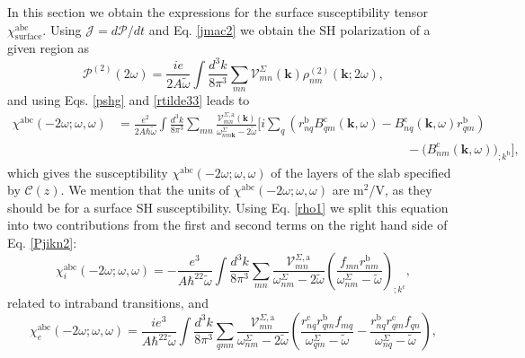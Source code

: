 In this section we obtain the expressions for the surface susceptibility tensor
$\chi^{\mathrm{abc}}_{\mathrm{surface}}$. Using
$\boldsymbol{\mathcal{J}}=d\boldsymbol{\mathcal{P}}/dt$ and Eq. \eqref{jmac2} we
obtain the SH polarization of a given region as
\begin{equation}\label{Pjikn}
\boldsymbol{\mathcal{P}}^{(2)}(2\omega)
= \frac{ie}{2A\tilde\omega} \int \frac{d^3 k}{8\pi^3}
\sum_{mn} \boldsymbol{\mathcal{V}}^{\Sigma}_{mn}(\mathbf{k})
\rho^{(2)}_{nm}(\mathbf{k};2\omega),
\end{equation}
and using Eqs. \eqref{pshg} and \eqref{rtilde33} leads to
\begin{align}\label{Pjikn2}
\chi^{\mathrm{a}\mathrm{b}\mathrm{c}}(-2\omega;\omega,\omega) 
&= \frac{e^2}{2A\hbar\tilde\omega}
\int \frac{d^3 k}{8\pi^3}
\sum_{mn}
\frac{\boldsymbol{\mathcal{V}}^{\Sigma,\mathrm{a}}_{mn}(\mathbf{k})}
{\omega^\Sigma_{nm\mathbf{k}}-2\tilde\omega}
\bigg[
i\sum_q\left(r_{nq}^{\mathrm{b}}B_{qm}^{\mathrm{c}}(\mathbf{k},\omega) -
  B_{nq}^{\mathrm{c}}(\mathbf{k},\omega) 
  r_{qm}^{\mathrm{b}}\right)\nonumber\\
&\qquad\qquad\qquad\qquad\qquad\qquad\qquad\qquad\qquad\qquad\qquad\quad
-\Big(B_{nm}^{\mathrm{c}}(\mathbf{k},\omega)\Big)_{;k^{\mathrm{b}}}
\bigg],
\end{align}
which gives the susceptibility
$\chi^{\mathrm{a}\mathrm{b}\mathrm{c}}(-2\omega;\omega,\omega)$ of the layers of
the slab specified by $\boldsymbol{\mathcal{C}}(z)$. We mention that the units
of $\chi^{\mathrm{a}\mathrm{b}\mathrm{c}}(-2\omega;\omega,\omega)$ are m$^2$/V,
as they should be for a surface SH susceptibility. Using Eq. \eqref{rho1} we
split this equation into two contributions from the first and second terms on
the right hand side of Eq. \eqref{Pjikn2}:
\begin{equation}
\chi^{\mathrm{a}\mathrm{b}\mathrm{c}}_i (-2\omega;\omega,\omega)
=-\frac{e^3}{A\hbar^22\tilde\omega}
\int \frac{d^3 k}{8\pi^3}
\sum_{mn}
\frac{\boldsymbol{\mathcal{V}}_{mn}^{\Sigma,\mathrm{a}}}
{\omega^\Sigma_{nm}-2\tilde\omega}
\left(\frac{f_{mn}r_{nm}^{\mathrm{b}}}
{\omega^\Sigma_{nm}-\tilde\omega}\right)_{;k^{\mathrm{c}}},
\label{chii}
\end{equation} 
related to intraband transitions, and 
\begin{equation}
\chi^{\mathrm{a}\mathrm{b}\mathrm{c}}_e (-2\omega;\omega,\omega)
=\frac{ie^3}{A\hbar^22\tilde\omega}
\int \frac{d^3 k}{8\pi^3}
\sum_{qmn}
\frac{\boldsymbol{\mathcal{V}}_{mn}^{\Sigma,\mathrm{a}}}{\omega^\Sigma_{nm}-2\tilde\omega}
\left(
\frac{r_{nq}^{\mathrm{c}} r_{qm}^{\mathrm{b}} 
f_{mq}}{\omega^\Sigma_{qm}-\tilde\omega}
-\frac{r_{nq}^{\mathrm{b}} r_{qm}^{\mathrm{c}} 
f_{qn}}{\omega^\Sigma_{nq}-\tilde\omega}
\right),
\label{chie}
\end{equation} 
